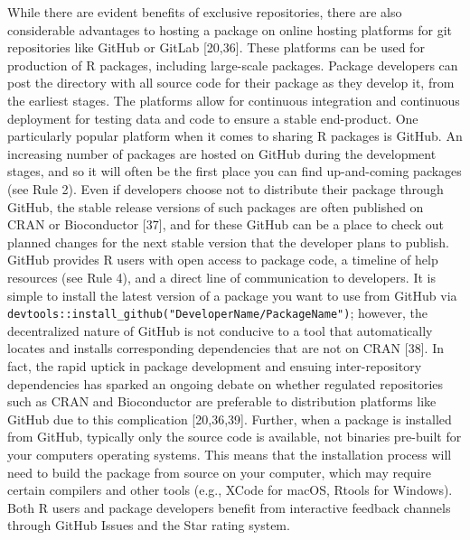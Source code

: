 \documentclass[10pt,letterpaper]{article}
\begin{document}
While there are evident benefits of exclusive repositories, there are
also considerable advantages to hosting a package on online hosting
platforms for git repositories like GitHub or GitLab {[}20,36{]}. These
platforms can be used for production of R packages, including
large-scale packages. Package developers can post the directory with all
source code for their package as they develop it, from the earliest
stages. The platforms allow for continuous integration and continuous
deployment for testing data and code to ensure a stable end-product. One
particularly popular platform when it comes to sharing R packages is
GitHub. An increasing number of packages are hosted on GitHub during the
development stages, and so it will often be the first place you can find
up-and-coming packages (see Rule 2). Even if developers choose not to
distribute their package through GitHub, the stable release versions of
such packages are often published on CRAN or Bioconductor {[}37{]}, and
for these GitHub can be a place to check out planned changes for the
next stable version that the developer plans to publish. GitHub provides
R users with open access to package code, a timeline of help resources
(see Rule 4), and a direct line of communication to developers. It is
simple to install the latest version of a package you want to use from
GitHub via
\texttt{devtools::install\_github("DeveloperName/PackageName")};
however, the decentralized nature of GitHub is not conducive to a tool
that automatically locates and installs corresponding dependencies that
are not on CRAN {[}38{]}. In fact, the rapid uptick in package
development and ensuing inter-repository dependencies has sparked an
ongoing debate on whether regulated repositories such as CRAN and
Bioconductor are preferable to distribution platforms like GitHub due to
this complication {[}20,36,39{]}. Further, when a package is installed
from GitHub, typically only the source code is available, not binaries
pre-built for your computers operating systems. This means that the
installation process will need to build the package from source on your
computer, which may require certain compilers and other tools (e.g.,
XCode for macOS, Rtools for Windows). Both R users and package
developers benefit from interactive feedback channels through GitHub
Issues and the Star rating system.
\end{document}
